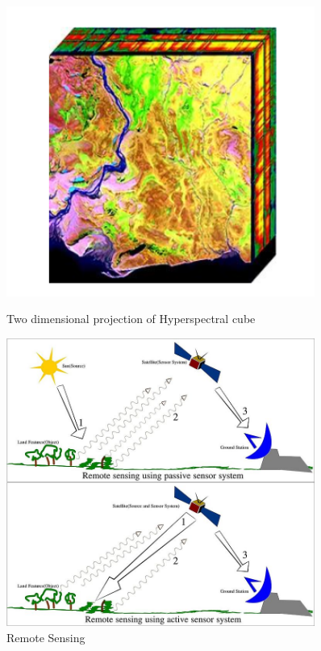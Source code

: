 \documentclass[document.tex]{subfiles}
\begin{document}
\begin{figure}[H]
	\centering
	\begin{minipage}{0.45\textwidth}
		\centering
		\includegraphics[width=0.9\textwidth]{imgs/cube.png} %
		\caption{Two dimensional projection
			of Hyperspectral cube}
		\label{fig: Two dimensional projection
			of Hyperspectral cube}
	\end{minipage}
	\begin{minipage}{0.40\textwidth}
		\centering
		\includegraphics[width=0.9\textwidth]{imgs/Remote_Sensing.jpg} %
		\caption{Remote Sensing}
		\label{fig: Remote Sensing}
	\end{minipage}\hfill
\end{figure}
\end{document}
